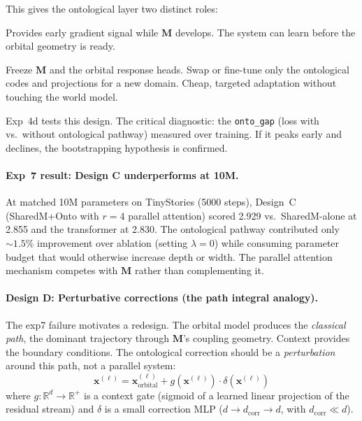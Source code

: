 \documentclass[11pt, a4paper]{article}
\newcommand{\M}{\mathbf{M}}
\newcommand{\x}{\mathbf{x}}
\newcommand{\R}{\mathbb{R}}
\theoremstyle{remark}
\begin{document}
This gives the ontological layer two distinct roles:
\begin{description}[nosep]
    \item[During training: bootstrapper.] Provides early gradient signal while $\M$ develops.
    The system can learn before the orbital geometry is ready.
    \item[After training: fine-tuning surface.] Freeze $\M$ and the orbital response heads.
    Swap or fine-tune only the ontological codes and projections for a new domain.
    Cheap, targeted adaptation without touching the world model.
\end{description}

\noindent
Exp~4d tests this design. The critical diagnostic: the \texttt{onto\_gap} (loss with vs.\ without ontological pathway) measured over training.
If it peaks early and declines, the bootstrapping hypothesis is confirmed.

\paragraph{Exp~7 result: Design C underperforms at 10M.}
At matched 10M parameters on TinyStories (5000 steps), Design~C (SharedM+Onto with $r{=}4$ parallel attention) scored 2.929 vs.\ SharedM-alone at 2.855 and the transformer at 2.830.
The ontological pathway contributed only ${\sim}1.5\%$ improvement over ablation (setting $\lambda{=}0$) while consuming parameter budget that would otherwise increase depth or width.
The parallel attention mechanism competes with $\M$ rather than complementing it.

\paragraph{Design D: Perturbative corrections (the path integral analogy).}
The exp7 failure motivates a redesign.
The orbital model produces the \emph{classical path}, the dominant trajectory through $\M$'s coupling geometry.
Context provides the boundary conditions.
The ontological correction should be a \emph{perturbation} around this path, not a parallel system:
\[
    \x^{(\ell)} = \x^{(\ell)}_{\text{orbital}} + g(\x^{(\ell)}) \cdot \delta(\x^{(\ell)})
\]
where $g: \R^d \to \R^+$ is a context gate (sigmoid of a learned linear projection of the residual stream) and $\delta$ is a small correction MLP ($d \to d_{\text{corr}} \to d$, with $d_{\text{corr}} \ll d$).
\end{document}
